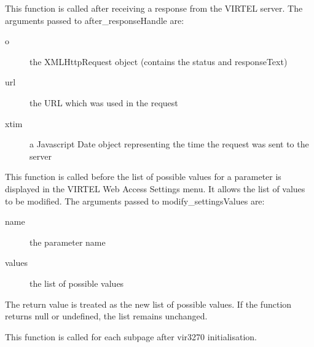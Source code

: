 \documentclass[letterpaper,10pt,english]{sphinxmanual}
\begin{document}
\begin{sphinxVerbatim}[commandchars=\\\{\}]
\end{sphinxVerbatim}

This function is called after receiving a response from the VIRTEL server. The arguments passed to after\_responseHandle are:
\begin{description}
\item[{o}] \leavevmode
the XMLHttpRequest object (contains the status and responseText)

\item[{url}] \leavevmode
the URL which was used in the request

\item[{xtim}] \leavevmode
a Javascript Date object representing the time the request was sent to the server

\end{description}

\begin{sphinxVerbatim}[commandchars=\\\{\}]
\end{sphinxVerbatim}

This function is called before the list of possible values for a parameter is displayed in the VIRTEL Web Access Settings menu. It allows the list of values to be modified. The arguments passed to modify\_settingsValues are:
\begin{description}
\item[{name}] \leavevmode
the parameter name

\item[{values}] \leavevmode
the list of possible values

\end{description}

The return value is treated as the new list of possible values. If the function returns null or undefined, the list remains
unchanged.

\begin{sphinxVerbatim}[commandchars=\\\{\}]
\end{sphinxVerbatim}

This function is called for each subpage after vir3270 initialisation.
\end{document}
